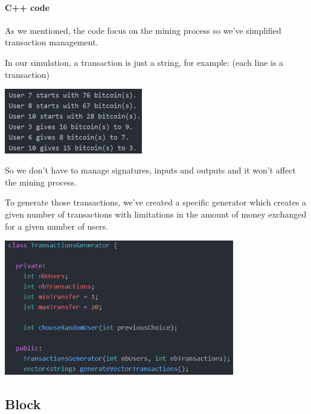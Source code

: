 \begin{aside}

\paragraph{C++ code}

As we mentioned, the code focus on the mining process so we've simplified transaction management. \newline

In our simulation, a transaction is just a string, for example: (each line is a transaction) \newline

\includegraphics[width=6cm]{Figures/transactionsExample}
\medskip

So we don't have to manage signatures, inputs and outputs and it won't affect the mining process.

\clearpage

To generate those transactions, we've created a specific generator which creates a given number of transactions with limitations in the amount of money exchanged for a given number of users. \newline

\includegraphics[width=10cm]{Figures/ClassTransactionsGenerator}
\medskip

\end{aside}
\medskip


  \subsection{Block}

